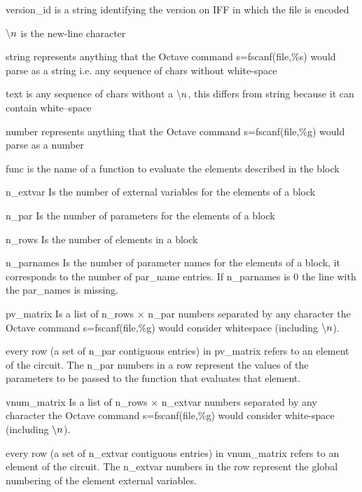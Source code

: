 \documentclass{scrartcl}
\let\tt=\normalfont\ttfamily
\let\it=\normalfont\itshape
\newcommand{\Iff}{{\tt IFF}}
\newcommand{\nl}{{\tt \backslash n}}
\newcommand{\oct}{{\tt Octave}}
\begin{document}
\begin{description}
\item  {\tt version\_id} is a string identifying the version on {\Iff} 
  in which the file is encoded
\item  $\nl$ is the new-line character
\item {\tt string} represents anything that the {\oct} command 
  {\tt s=fscanf(file,\%s) } would parse as a string {\it i.e.} any sequence of 
  chars without white-space
\item {\tt text} is any sequence of chars without a $\nl$, 
  this differs from {\tt string} because it can contain white--space
\item {\tt number} represents anything that the {\oct} command 
  {\tt s=fscanf(file,\%g) } would parse as a number
\item {\tt func} is the name of a function to evaluate the elements 
  described in the block
\item {\tt n\_extvar} Is the number of {\it external variables} 
  for the elements of a block
\item {\tt n\_par} Is the number of {\it parameters} for the elements 
  of a block
\item {\tt n\_rows} Is the number of {\it elements} in a block
\item {\tt n\_parnames} Is the number of {\it parameter names} for the 
  elements of a block, it corresponds to the number of {\tt par\_name} entries.
  If {\tt n\_parnames} is 0 the line with the {\tt par\_name}s is missing.
\item {\tt pv\_matrix} Is a list of {\tt n\_rows} $\times$ 
  {\tt n\_par} numbers separated by any character the 
  {\oct} command {\tt s=fscanf(file,\%g) } would consider whitespace 
  (including $\nl$).
\item [] every row (a set of {\tt n\_par} contiguous entries) 
  in {\tt pv\_matrix} refers to an element of the circuit. 
  The {\tt n\_par} numbers in a row represent the values of the 
  parameters to be passed to the function that evaluates that element.
\item {\tt vnum\_matrix} Is a list of {\tt n\_rows} $\times$ {\tt n\_extvar }
  numbers separated by any character the {\oct} command {\tt s=fscanf(file,\%g) } 
  would consider white-space (including $\nl$).
\item [] every row (a set of {\tt n\_extvar} contiguous entries) 
  in {\tt vnum\_matrix} refers to an element of the circuit. 
  The {\tt n\_extvar} numbers in the row represent the global numbering of the element 
  external variables.
\end{description}
\end{document}

